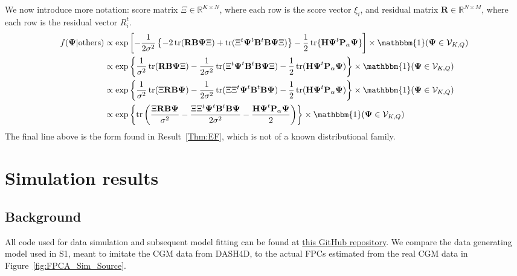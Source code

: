 \documentclass[12pt]{article}
\DeclareMathOperator{\tr}{tr}
\begin{document}
We now introduce more notation: score matrix $\Xi \in \mathbb{R}^{K \times N}$, where each row is the score vector $\xi_i$, and residual matrix $\mathbf{R} \in \mathbb{R}^{N \times M}$, where each row is the residual vector $R_i^t$.
\begin{align*}
    f(\boldsymbol{\Psi}|{\rm others}) & \propto \exp\left[-\frac{1}{2\sigma^2}\left\{- 2 \tr(\mathbf{R} \mathbf{B}\boldsymbol{\Psi}\Xi) + \tr(\Xi^t \boldsymbol{\Psi}^t\mathbf{B}^t \mathbf{B} \boldsymbol{\Psi} \Xi)\right\} -\frac{1}{2}\tr\{\mathbf{H} \boldsymbol{\Psi}^t \mathbf{P}_\alpha \boldsymbol{\Psi}\}\right] \times \mathbbm{1}(\boldsymbol{\Psi} \in \mathcal{V}_{K,Q})\\
    & \propto \exp\left\{\frac{1}{\sigma^2}\tr(\mathbf{R} \mathbf{B} \boldsymbol{\Psi} \Xi) - \frac{1}{2\sigma^2}\tr(\Xi^t \boldsymbol{\Psi}^t \mathbf{B}^t \mathbf{B} \boldsymbol{\Psi} \Xi) - \frac{1}{2}\tr(\mathbf{H}\boldsymbol{\Psi}^t \mathbf{P}_\alpha \boldsymbol{\Psi}) \right\}\times \mathbbm{1}(\boldsymbol{\Psi} \in \mathcal{V}_{K,Q})\\
    & \propto \exp\left\{\frac{1}{\sigma^2}\tr(\Xi \mathbf{R} \mathbf{B} \boldsymbol{\Psi}) - \frac{1}{2\sigma^2}\tr(\Xi \Xi^t \boldsymbol{\Psi}^t \mathbf{B}^t \mathbf{B} \boldsymbol{\Psi}) - \frac{1}{2}\tr(\mathbf{H}\boldsymbol{\Psi}^t \mathbf{P}_\alpha \boldsymbol{\Psi}) \right\}\times \mathbbm{1}(\boldsymbol{\Psi} \in \mathcal{V}_{K,Q})\\
    & \propto \exp\left\{\tr \left( \frac{\Xi \mathbf{R} \mathbf{B} \boldsymbol{\Psi}}{\sigma^2} - \frac{\Xi \Xi^t \boldsymbol{\Psi}^t \mathbf{B}^t \mathbf{B} \boldsymbol{\Psi}}{2\sigma^2} - \frac{\mathbf{H}\boldsymbol{\Psi}^t \mathbf{P}_\alpha \boldsymbol{\Psi}}{2} \right)\right\}\times \mathbbm{1}(\boldsymbol{\Psi} \in \mathcal{V}_{K,Q})
\end{align*}
The final line above is the form found in Result~\ref{Thm:EF}, which is not of a known distributional family.

\section{Simulation results}\label{supp:Simulations}

\subsection{Background}\label{supp:simGen}
All code used for data simulation and subsequent model fitting can be found at \href{https://github.com/JSartini/FAST-BFPCA}{this GitHub repository}. We compare the data generating model used in S1, meant to imitate the CGM data from DASH4D, to the actual FPCs estimated from the real CGM data in Figure~\ref{fig:FPCA_Sim_Source}.
\end{document}
